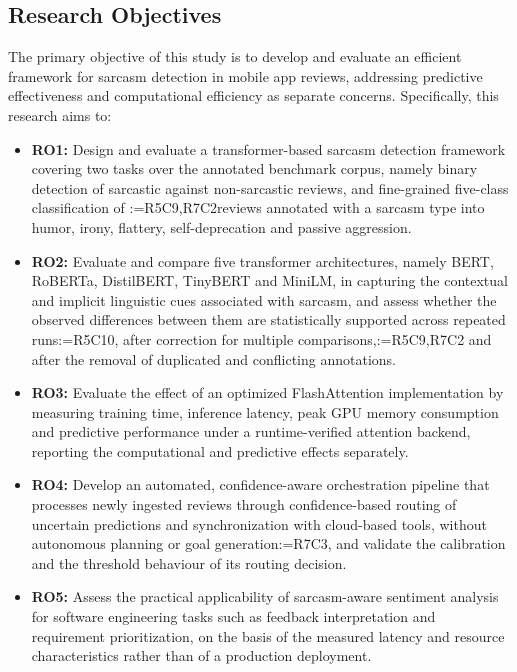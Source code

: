 \documentclass[a4paper,fleqn]{cas-sc}
\makeatletter
\newif\iftracked
\newcommand{\rv@setcolour}[1]{%
  \IfStrEq{#1}{R7C7}{\color{rvEdit}}{%
    \IfSubStr{#1}{R5}{\IfSubStr{#1}{R7}{\color{rvBoth}}{\color{rvFive}}}{\color{rvSeven}}}}
\newcommand{\rv@tag}[1]{\textsuperscript{\sffamily\bfseries\scriptsize[\StrSubstitute{#1}{,}{, }]}\,}
\newcommand{\rv@recordone}[1]{%
  \edef\rv@i{#1}%
  \ifcsdef{rv@n@\rv@i}{}{\csgdef{rv@n@\rv@i}{0}}%
  \csxdef{rv@n@\rv@i}{\the\numexpr\csuse{rv@n@\rv@i}+1\relax}%
  \begingroup\edef\@currentlabel{\rv@i}\label{rv:\rv@i:\csuse{rv@n@\rv@i}}\endgroup}
\newcommand{\rv@record}[1]{\@for\rv@id:=#1\do{\expandafter\rv@recordone\expandafter{\rv@id}}}
\DeclareRobustCommand{\rc}[2]{\rv@record{#1}\iftracked{\rv@setcolour{#1}\rv@tag{#1}#2}\else#2\fi}
\DeclareRobustCommand{\rcrep}[3]{\rv@record{#1}\iftracked{\rv@setcolour{#1}\rv@tag{#1}\rv@strike{#2} #3}\else#3\fi}
\makeatother
\begin{document}
\subsection{Research Objectives}
The primary objective of this study is to develop and evaluate an efficient framework for sarcasm detection in mobile app reviews, addressing predictive effectiveness and computational efficiency as separate concerns. Specifically, this research aims to:
\begin{itemize}
\item \textbf{RO1:} Design and evaluate a transformer-based sarcasm detection framework covering two tasks over the annotated benchmark corpus, namely binary detection of sarcastic against non-sarcastic reviews, and fine-grained five-class classification of \rcrep{R5C9,R7C2}{sarcastic reviews}{reviews annotated with a sarcasm type} into humor, irony, flattery, self-deprecation and passive aggression.
\item \textbf{RO2:} Evaluate and compare five transformer architectures, namely BERT, RoBERTa, DistilBERT, TinyBERT and MiniLM, in capturing the contextual and implicit linguistic cues associated with sarcasm, and assess whether the observed differences between them are statistically supported across repeated runs\rc{R5C10}{, after correction for multiple comparisons,}\rc{R5C9,R7C2}{ and after the removal of duplicated and conflicting annotations}.
\item \textbf{RO3:} Evaluate the effect of an optimized FlashAttention implementation by measuring training time, inference latency, peak GPU memory consumption and predictive performance under a runtime-verified attention backend, reporting the computational and predictive effects separately.
\item \textbf{RO4:} Develop an automated, confidence-aware orchestration pipeline that processes newly ingested reviews through confidence-based routing of uncertain predictions and synchronization with cloud-based tools, without autonomous planning or goal generation\rc{R7C3}{, and validate the calibration and the threshold behaviour of its routing decision}.
\item \textbf{RO5:} Assess the practical applicability of sarcasm-aware sentiment analysis for software engineering tasks such as feedback interpretation and requirement prioritization, on the basis of the measured latency and resource characteristics rather than of a production deployment.
\end{itemize}
\end{document}
